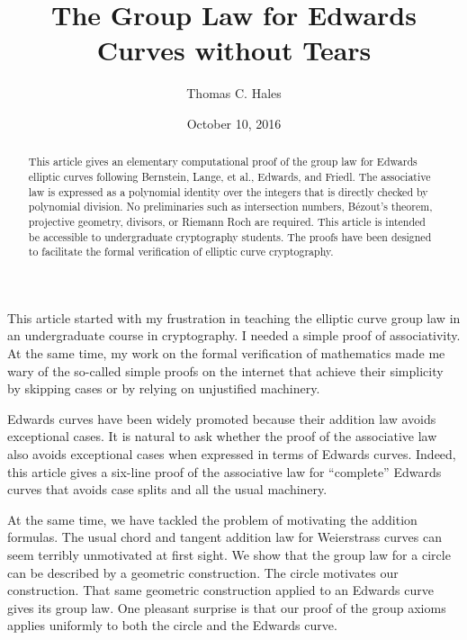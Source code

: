 \documentclass[12pt]{article}
\title{The Group Law for Edwards Curves without Tears}
\author{Thomas C. Hales}
\date{October 10, 2016}
\begin{document}
\maketitle

\begin{abstract} 
  This article gives an elementary computational proof of the group
  law for Edwards elliptic curves following  Bernstein, Lange, et al.,
  Edwards, and Friedl.  The associative law is expressed as a polynomial
  identity over the integers that is directly checked by polynomial division.
  No preliminaries such as intersection numbers, 
  B\'ezout's theorem, projective geometry, divisors,
  or Riemann Roch are required. This article is intended be accessible to
  undergraduate cryptography students.  The proofs have been designed
  to facilitate the formal verification of elliptic curve cryptography.
\end{abstract}

\baselineskip
{}\baselineskip

\newenvironment{blockquote}{%
  \par%
  \medskip%
  \baselineskip=0.7\baselineskip%
  \leftskip=2em\rightskip=2em%
  \noindent\ignorespaces}{%
  \par\medskip}

This article started with my frustration in teaching the elliptic curve group law
 in an undergraduate course in cryptography.  I needed
a simple proof of associativity.  At the same time, my work on the
formal verification of mathematics made me wary of the so-called simple proofs 
on the internet that achieve their simplicity by skipping cases or by relying on
unjustified machinery.  

Edwards curves have been widely
promoted because their addition law avoids exceptional cases.  
It is natural to ask whether the proof of the associative law also avoids exceptional
cases when expressed in terms of Edwards curves.  Indeed, this article gives
a six-line proof of the associative law for ``complete'' Edwards curves
that avoids case splits and all the usual machinery.   

At the same time, we have tackled the problem of motivating the addition
formulas.  The usual chord and tangent addition law for Weierstrass curves
can seem terribly unmotivated at first sight.  We show that the
group law for a circle can be described by a geometric construction.  
The circle motivates our construction.  That
same geometric construction applied to an Edwards curve gives its group law.
One pleasant surprise is that our proof of the group axioms applies 
uniformly to both the circle and the
Edwards curve.  
\end{document}
